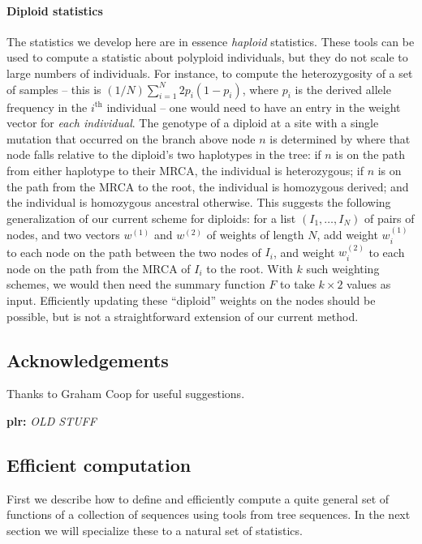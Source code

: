 \documentclass{article}
\newcommand{\plr}[1]{{\color{blue}\textbf{plr:} \it #1}}
\begin{document}
\paragraph{Diploid statistics}
The statistics we develop here are in essence \emph{haploid} statistics.
These tools can be used to compute a statistic about polyploid individuals,
but they do not scale to large numbers of individuals.
For instance, to compute the heterozygosity of a set of samples
-- this is $(1/N) \sum_{i=1}^N 2 p_i (1-p_i)$, where $p_i$ is the derived allele frequency
in the $i^\text{th}$ individual --
one would need to have an entry in the weight vector for \emph{each individual}.
The genotype of a diploid at a site with a single mutation that occurred on the branch above node $n$
is determined by where that node falls relative to the diploid's two haplotypes in the tree:
if $n$ is on the path from either haplotype to their MRCA, the individual is heterozygous;
if $n$ is on the path from the MRCA to the root, the individual is homozygous derived;
and the individual is homozygous ancestral otherwise.
This suggests the following generalization of our current scheme for diploids:
for a list $(I_1, \ldots, I_N)$ of pairs of nodes,
and two vectors $w^{(1)}$ and $w^{(2)}$ of weights of length $N$,
add weight $w^{(1)}_i$ to each node on the path between the two nodes of $I_i$,
and weight $w^{(2)}_i$ to each node on the path from the MRCA of $I_i$ to the root.
With $k$ such weighting schemes, we would then need the summary function $F$
to take $k \times 2$ values as input.
Efficiently updating these ``diploid'' weights on the nodes should be possible,
but is not a straightforward extension of our current method.




\subsection*{Acknowledgements}
Thanks to Graham Coop for useful suggestions.




\newpage
\appendix

{\Large \plr{OLD STUFF}}

\subsection*{Efficient computation}

First we describe how to define
and efficiently compute a quite general set of functions of a collection of sequences
using tools from tree sequences.
In the next section we will specialize these to a natural set of statistics.
\end{document}
